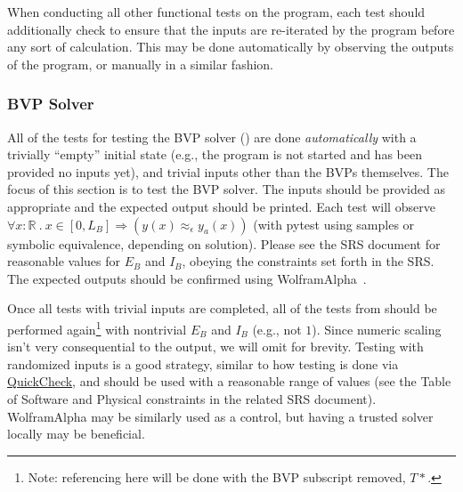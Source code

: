\documentclass[12pt, titlepage]{article}
\begin{document}
When conducting all other functional tests on the program, each test should
additionally check to ensure that the inputs are re-iterated by the program
before any sort of calculation. This may be done automatically by observing the
outputs of the program, or manually in a similar fashion.

\subsubsection{BVP Solver}

All of the tests for testing the BVP solver ()
are done \textit{automatically} with a trivially ``empty'' initial state (e.g.,
the program is not started and has been provided no inputs yet), and trivial
inputs other than the BVPs themselves. The focus of this section is to test the
BVP solver. The inputs should be provided as appropriate and the expected output
should be printed. Each test will observe \(\forall x : \mathbb{R} ~.~x \in [0,
L_B] \Rightarrow (y(x) \approx_{\epsilon} y_a(x))\) (with pytest using samples
or symbolic equivalence, depending on solution). Please see the SRS document for
reasonable values for $E_B$ and $I_B$, obeying the constraints set forth in the
SRS. The expected outputs should be confirmed using
WolframAlpha~\cite{WolframAlpha}.

Once all tests with trivial inputs are completed, all of the tests from
 should be performed again\footnote{Note:
referencing here will be done with the BVP subscript removed, $T*$.} with
nontrivial $E_B$ and $I_B$ (e.g., not $1$). Since numeric scaling isn't very
consequential to the output, we will omit for brevity. Testing with randomized
inputs is a good strategy, similar to how testing is done via
\href{https://hackage.haskell.org/package/QuickCheck}{QuickCheck}, and should be
used with a reasonable range of values (see the Table of Software and Physical
constraints in the related SRS document). WolframAlpha may be similarly used as
a control, but having a trusted solver locally may be beneficial.
\end{document}
